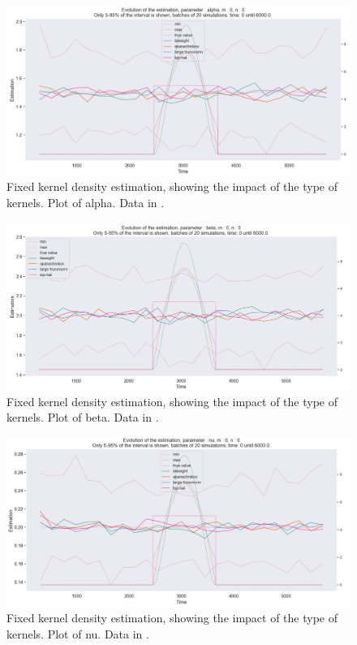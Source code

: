 \begin{figure}
\centering
\includegraphics[width = 0.90 \textwidth]{../imag/chap3/compar_kernel/alpha.png}
\caption{Fixed kernel density estimation, showing the impact of the type of kernels. Plot of alpha. Data in \protect {}.}
\label{fig:basic_5_kernels_alpha}
\end{figure}

\begin{figure}
\centering
\includegraphics[width = 0.90 \textwidth]{../imag/chap3/compar_kernel/beta.png}
\caption{Fixed kernel density estimation, showing the impact of the type of kernels. Plot of beta. Data in \protect {}.}
\label{fig:basic_5_kernels_beta}
\end{figure}

\begin{figure}
\centering
\includegraphics[width = 0.90 \textwidth]{../imag/chap3/compar_kernel/nu.png}
\caption{Fixed kernel density estimation, showing the impact of the type of kernels. Plot of nu. Data in \protect {}.}
\label{fig:basic_5_kernels_nu}
\end{figure}







